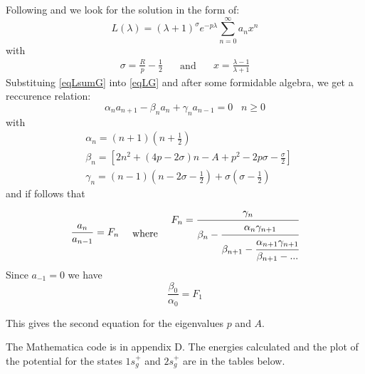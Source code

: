 Following \cite{Bates1} and \cite{H2Plus2d2} we look for the solution in the form of:
\begin{equation}\label{eqLsumG}
L(\lambda) = \left(\lambda +1\right)^\sigma e^{-p\lambda}\sum_{n=0}^{\infty}{a_nx^n}
\end{equation}
with
\begin{equation}
\begin{split}
\sigma = \frac{R}{p} - \frac{1}{2}
\end{split}
\quad\text{ and }\quad
\begin{split}
x = \frac{\lambda-1}{\lambda+1}
\end{split}
\end{equation}
Substituing \eqref{eqLsumG} into \eqref{eqLG} and after some formidable algebra, we get a reccurence relation:
\begin{equation}
\alpha_na_{n+1}-\beta_n a_n+\gamma_na_{n-1} = 0\,\,\,\,\,n \ge 0
\end{equation}
with
\begin{equation}
\begin{split}
& \alpha_n = \left(n + 1\right)\left(n + \frac{1}{2}\right)\\[.8em]
& \beta_n = \left[2n^2 + (4p - 2\sigma)n - A + p^2 - 2p\sigma - \frac{\sigma}{2}\right] \\[.8em]
& \gamma_n = (n-1)\left(n - 2\sigma - \frac{1}{2}\right) + \sigma\left(\sigma - \frac{1}{2}\right)
\end{split}
\end{equation}
and if follows that
\begin{equation}
\begin{split}
\frac{a_n}{a_{n-1}} = F_n
\end{split}
\quad\text{ where }\quad
\begin{split}
F_n = \cfrac{\gamma_n}{\beta_n - \cfrac{\alpha_n \gamma_{n+1}}{\beta_{n+1}-\cfrac{\alpha_{n+1}\gamma_{n+1}}{\beta_{n+1}-\text{...}}}}
\end{split}
\end{equation}
Since $ a_{-1} = 0$ we have
\begin{equation}
\frac{\beta_0}{\alpha_0} = F_1
\end{equation}

This gives  the second equation  for the eigenvalues $ p $ and $ A $.

The Mathematica code is in appendix D. The energies calculated and the plot of the potential for the states $1s_g^{+}$ and $ 2s_g^{+} $ are in the tables below.

